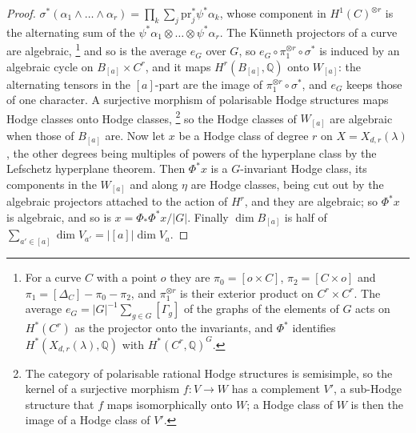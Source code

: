\documentclass[11pt,reqno]{amsart}
\theoremstyle{plain}
\theoremstyle{definition}
\theoremstyle{remark}
\newcommand{\QQ}{\mathbb{Q}}
\begin{document}
\begin{proof}
$\sigma^{*}(\alpha_{1}\wedge\dots\wedge\alpha_{r})=\prod_{k}\sum_{j}
\mathrm{pr}_{j}^{*}\psi^{*}\alpha_{k}$, whose component in
$H^{1}(C)^{\otimes r}$ is the alternating sum of the
$\psi^{*}\alpha_{1}\otimes\dots\otimes\psi^{*}\alpha_{r}$. The K\"unneth
projectors of a curve are algebraic,%
\footnote{For a curve $C$ with a point $o$ they are $\pi_{0}=[o\times C]$,
$\pi_{2}=[C\times o]$ and $\pi_{1}=[\Delta_{C}]-\pi_{0}-\pi_{2}$, and
$\pi_{1}^{\otimes r}$ is their exterior product on $C^{r}\times C^{r}$. The
average $e_{G}=|G|^{-1}\sum_{g\in G}[\Gamma_{g}]$ of the graphs of the
elements of $G$ acts on $H^{*}(C^{r})$ as the projector onto the invariants,
and $\Phi^{*}$ identifies $H^{*}(X_{d,r}(\lambda),\QQ)$ with
$H^{*}(C^{r},\QQ)^{G}$.} and so is the average $e_{G}$ over $G$,
so $e_{G}\circ\pi_{1}^{\otimes r}\circ\sigma^{*}$ is induced by an algebraic
cycle on $B_{[a]}\times C^{r}$, and it maps $H^{r}(B_{[a]},\QQ)$ onto
$W_{[a]}$: the alternating tensors in the $[a]$-part are the image of
$\pi_{1}^{\otimes r}\circ\sigma^{*}$, and $e_{G}$ keeps those of one
character. A surjective morphism of polarisable Hodge structures maps Hodge
classes onto Hodge classes,%
\footnote{The category of polarisable rational Hodge structures is semisimple,
so the kernel of a surjective morphism $f\colon V\to W$ has a complement
$V'$, a sub-Hodge structure that $f$ maps isomorphically onto $W$; a Hodge
class of $W$ is then the image of a Hodge class of $V'$.} so the Hodge classes of $W_{[a]}$ are algebraic
when those of $B_{[a]}$ are. Now let $x$ be a Hodge class of degree $r$ on
$X=X_{d,r}(\lambda)$, the other degrees being multiples of powers of the
hyperplane class by the Lefschetz hyperplane theorem. Then $\Phi^{*}x$ is a
$G$-invariant Hodge class, its components in the $W_{[a]}$ and along $\eta$
are Hodge classes, being cut out by the algebraic projectors attached to
the action of $H^{r}$, and they are algebraic; so $\Phi^{*}x$ is algebraic,
and so is $x=\Phi_{*}\Phi^{*}x/|G|$.\enlargethispage{2pt} Finally $\dim B_{[a]}$ is half of
$\sum_{a'\in[a]}\dim V_{a'}=|[a]|\dim V_{a}$.
\end{proof}
\end{document}
